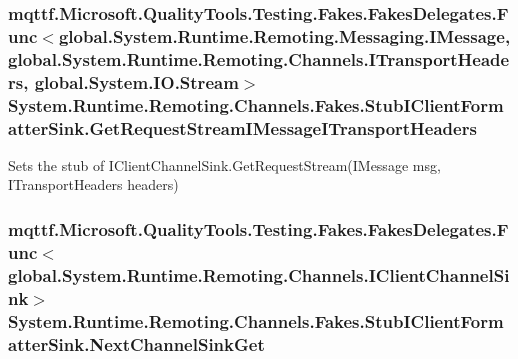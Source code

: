 \hypertarget{class_system_1_1_runtime_1_1_remoting_1_1_channels_1_1_fakes_1_1_stub_i_client_formatter_sink_ab737d21c00d845a16e97c41139356667}{
\subsubsection[{Get\-Request\-Stream\-I\-Message\-I\-Transport\-Headers}]{\setlength{\rightskip}{0pt plus 5cm}mqttf.\-Microsoft.\-Quality\-Tools.\-Testing.\-Fakes.\-Fakes\-Delegates.\-Func$<$global.\-System.\-Runtime.\-Remoting.\-Messaging.\-I\-Message, global.\-System.\-Runtime.\-Remoting.\-Channels.\-I\-Transport\-Headers, global.\-System.\-I\-O.\-Stream$>$ System.\-Runtime.\-Remoting.\-Channels.\-Fakes.\-Stub\-I\-Client\-Formatter\-Sink.\-Get\-Request\-Stream\-I\-Message\-I\-Transport\-Headers}}\label{class_system_1_1_runtime_1_1_remoting_1_1_channels_1_1_fakes_1_1_stub_i_client_formatter_sink_ab737d21c00d845a16e97c41139356667}


Sets the stub of I\-Client\-Channel\-Sink.\-Get\-Request\-Stream(\-I\-Message msg, I\-Transport\-Headers headers)

\hypertarget{class_system_1_1_runtime_1_1_remoting_1_1_channels_1_1_fakes_1_1_stub_i_client_formatter_sink_a03a6e8ac5ca91c4153b9e2a17ca46248}{
\subsubsection[{Next\-Channel\-Sink\-Get}]{\setlength{\rightskip}{0pt plus 5cm}mqttf.\-Microsoft.\-Quality\-Tools.\-Testing.\-Fakes.\-Fakes\-Delegates.\-Func$<$global.\-System.\-Runtime.\-Remoting.\-Channels.\-I\-Client\-Channel\-Sink$>$ System.\-Runtime.\-Remoting.\-Channels.\-Fakes.\-Stub\-I\-Client\-Formatter\-Sink.\-Next\-Channel\-Sink\-Get}}\label{class_system_1_1_runtime_1_1_remoting_1_1_channels_1_1_fakes_1_1_stub_i_client_formatter_sink_a03a6e8ac5ca91c4153b9e2a17ca46248}


